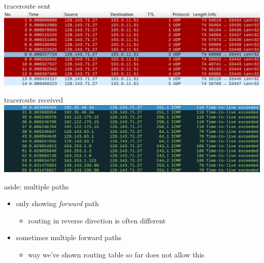 \begin{frame}{traceroute sent}
\includegraphics[width=\textwidth]{../routing/traceroute-v4-send}
\end{frame}

\begin{frame}{traceroute received}
\includegraphics[width=\textwidth]{../routing/traceroute-v4-recv}
\end{frame}

\begin{frame}{aside: multiple paths}
    \begin{itemize}
    \item only showing \textit{forward} path
        \begin{itemize}
        \item routing in reverse direction is often different
        \end{itemize}
    \item sometimes multiple forward paths
        \begin{itemize}
        \item way we've shown routing table so far does not allow this
        \end{itemize}
    \end{itemize}
\end{frame}
